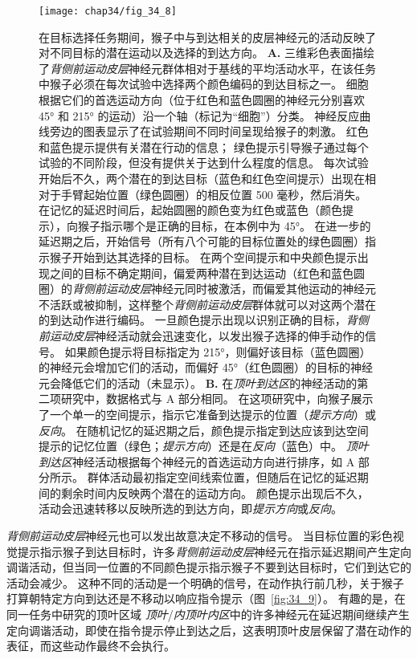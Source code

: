 \begin{figure}[htbp]
	\centering
	\texttt{[image: chap34/fig\_34\_8]}
	\caption{在目标选择任务期间，猴子中与到达相关的皮层神经元的活动反映了对不同目标的潜在运动以及选择的到达方向。
		\textbf{A.} 三维彩色表面描绘了\textit{背侧前运动皮层}神经元群体相对于基线的平均活动水平，在该任务中猴子必须在每次试验中选择两个颜色编码的到达目标之一。
		细胞根据它们的首选运动方向（位于红色和蓝色圆圈的神经元分别喜欢 45° 和 215° 的运动）沿一个轴（标记为“细胞”）分类。
		神经反应曲线旁边的图表显示了在试验期间不同时间呈现给猴子的刺激。
		红色和蓝色提示提供有关潜在行动的信息；
		绿色提示引导猴子通过每个试验的不同阶段，但没有提供关于达到什么程度的信息。
		每次试验开始后不久，两个潜在的到达目标（蓝色和红色空间提示）出现在相对于手臂起始位置（绿色圆圈）的相反位置 500 毫秒，然后消失。
		在记忆的延迟时间后，起始圆圈的颜色变为红色或蓝色（颜色提示），向猴子指示哪个是正确的目标，在本例中为 45°。
		在进一步的延迟期之后，开始信号（所有八个可能的目标位置处的绿色圆圈）指示猴子开始到达其选择的目标。
		在两个空间提示和中央颜色提示出现之间的目标不确定期间，偏爱两种潜在到达运动（红色和蓝色圆圈）的\textit{背侧前运动皮层}神经元同时被激活，而偏爱其他运动的神经元不活跃或被抑制，这样整个\textit{背侧前运动皮层}群体就可以对这两个潜在的到达动作进行编码。
		一旦颜色提示出现以识别正确的目标，\textit{背侧前运动皮层}神经活动就会迅速变化，以发出猴子选择的伸手动作的信号。
		如果颜色提示将目标指定为 215°，则偏好该目标（蓝色圆圈）的神经元会增加它们的活动，而偏好 45°（红色圆圈）的目标的神经元会降低它们的活动（未显示）\cite{cisek2010neural}。
		\textbf{B.} 在\textit{顶叶到达区}的神经活动的第二项研究中，数据格式与 A 部分相同。
		在这项研究中，向猴子展示了一个单一的空间提示，指示它准备到达提示的位置（\textit{提示方向}）或\textit{反向}。
		在随机记忆的延迟期之后，颜色提示指定到达应该到达空间提示的记忆位置（绿色；\textit{提示方向}）还是在\textit{反向}（蓝色）中。
		\textit{顶叶到达区}神经活动根据每个神经元的首选运动方向进行排序，如 A 部分所示。
		群体活动最初指定空间线索位置，但随后在记忆的延迟期间的剩余时间内反映两个潜在的运动方向。
		颜色提示出现后不久，活动会迅速转移以反映所选的到达方向，即\textit{提示方向}或\textit{反向}\cite{klaes2011choosing}。}
	\label{fig:34_8}
\end{figure}


\textit{背侧前运动皮层}神经元也可以发出故意决定不移动的信号。
当目标位置的彩色视觉提示指示猴子到达目标时，许多\textit{背侧前运动皮层}神经元在指示延迟期间产生定向调谐活动，但当同一位置的不同颜色提示指示猴子不要到达目标时，它们到达它的活动会减少。
这种不同的活动是一个明确的信号，在动作执行前几秒，关于猴子打算朝特定方向到达还是不移动以响应指令提示（图~\ref{fig:34_9}）。
有趣的是，在同一任务中研究的顶叶区域 \textit{顶叶}/\textit{内顶叶内区}中的许多神经元在延迟期间继续产生定向调谐活动，即使在指令提示停止到达之后，这表明顶叶皮层保留了潜在动作的表征，而这些动作最终不会执行。


